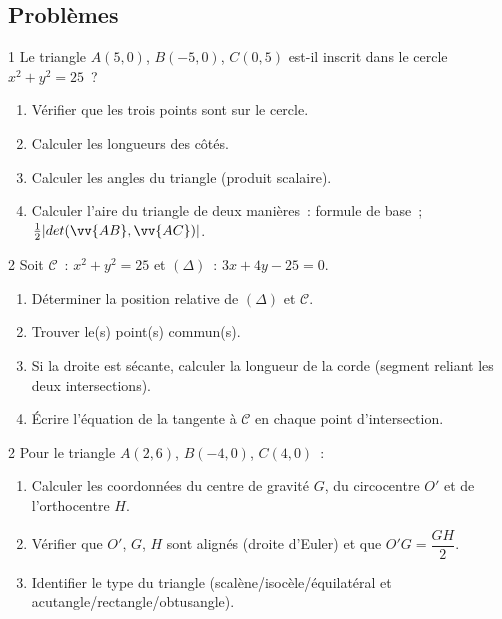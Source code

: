 \subsection*{Probl\`emes}

\begin{probleme}{1}
Le triangle $A(5,0)$, $B(-5,0)$, $C(0,5)$ est-il inscrit dans le cercle
$x^2+y^2=25$~?
\begin{enumerate}
  \item V\'erifier que les trois points sont sur le cercle.
  \item Calculer les longueurs des c\^ot\'es.
  \item Calculer les angles du triangle (produit scalaire).
  \item Calculer l'aire du triangle de deux mani\`eres~:
        formule de base~; $\frac{1}{2}|det(\vv{AB},\vv{AC})|$.
\end{enumerate}
\end{probleme}

\begin{probleme}{2}
Soit $\mathcal{C}$~: $x^2+y^2=25$ et $(\Delta)$~: $3x+4y-25=0$.
\begin{enumerate}
  \item D\'eterminer la position relative de $(\Delta)$ et $\mathcal{C}$.
  \item Trouver le(s) point(s) commun(s).
  \item Si la droite est s\'ecante, calculer la longueur de la corde
        (segment reliant les deux intersections).
  \item \'Ecrire l'\'equation de la tangente \`a $\mathcal{C}$ en chaque
        point d'intersection.
\end{enumerate}
\end{probleme}

\begin{probleme}{2}
Pour le triangle $A(2,6)$, $B(-4,0)$, $C(4,0)$~:
\begin{enumerate}
  \item Calculer les coordonn\'ees du centre de gravité $G$, du circocentre $O'$
        et de l'orthocentre $H$.
  \item V\'erifier que $O'$, $G$, $H$ sont align\'es (droite d'Euler)
        et que $O'G = \dfrac{GH}{2}$.
  \item Identifier le type du triangle (scalène/isoc\`ele/\'equilat\'eral
        et acutangle/rectangle/obtusangle).
\end{enumerate}
\end{probleme}

